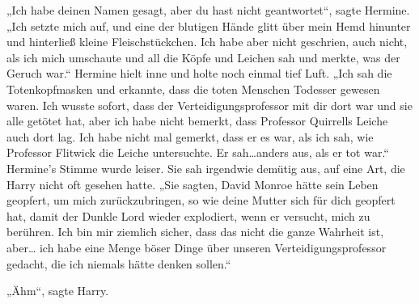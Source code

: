 „Ich habe deinen Namen gesagt, aber du hast nicht geantwortet“, sagte Hermine. „Ich setzte mich auf, und eine der blutigen Hände glitt über mein Hemd hinunter und hinterließ kleine Fleischstückchen. Ich habe aber nicht geschrien, auch nicht, als ich mich umschaute und all die Köpfe und Leichen sah und merkte, was der Geruch war.“ Hermine hielt inne und holte noch einmal tief Luft. „Ich sah die Totenkopfmasken und erkannte, dass die toten Menschen Todesser gewesen waren. Ich wusste sofort, dass der Verteidigungsprofessor mit dir dort war und sie alle getötet hat, aber ich habe nicht bemerkt, dass Professor Quirrells Leiche auch dort lag. Ich habe nicht mal gemerkt, dass er es war, als ich sah, wie Professor Flitwick die Leiche untersuchte. Er sah…anders aus, als er tot war.“
Hermine’s Stimme wurde leiser. Sie sah irgendwie demütig aus, auf eine Art, die Harry nicht oft gesehen hatte.
„Sie sagten, David Monroe hätte sein Leben geopfert, um mich zurückzubringen, so wie deine Mutter sich für dich geopfert hat, damit der Dunkle Lord wieder explodiert, wenn er versucht, mich zu berühren. Ich bin mir ziemlich sicher, dass das nicht die ganze Wahrheit ist, aber… ich habe eine Menge böser Dinge über unseren Verteidigungsprofessor gedacht, die ich niemals hätte denken sollen.“

„Ähm“, sagte Harry.

